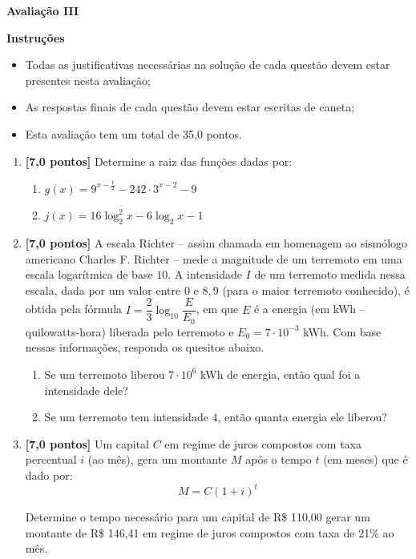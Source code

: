 \documentclass[12pt,a4paper]{article}
\begin{document}
\begin{center}
 \textbf{Avaliação III}
\end{center}

\textbf{Instruções}
\begin{itemize}
 \item Todas as justificativas necessárias na solução de cada questão devem estar presentes nesta avaliação;
 \item As respostas finais de cada questão devem estar escritas de caneta;
 \item Esta avaliação tem um total de 35,0 pontos.
\end{itemize}

\begin{enumerate}
  \item \textbf{[7,0 pontos]} Determine a raiz das funções dadas por:
    \begin{enumerate}
      \item $g(x) = 9^{x-\frac{1}{2}} - 242\cdot 3^{x-2} - 9$
      \item $j(x) = 16\log_2^2 x - 6\log_2 x - 1$
    \end{enumerate}
  
  \item \textbf{[7,0 pontos]} A escala Richter -- assim chamada em homenagem ao sismólogo americano
  Charles F. Richter -- mede a magnitude de um terremoto em uma escala logarítmica
  de base $10$. A intensidade $I$ de um terremoto medida nessa escala, dada por um
  valor entre $0$ e $8,9$ (para o maior terremoto conhecido), é obtida pela
  fórmula $I=\dfrac{2}{3}\log_{10}\dfrac{E}{E_{0}}$, em que $E$ é a energia
  (em kWh -- quilowatts-hora) liberada pelo terremoto e $E_{0}=7\cdot10^{-3}$ kWh.
  Com base nessas informações, responda os quesitos abaixo.
    \begin{enumerate}
      \item Se um terremoto liberou $7\cdot 10^6$ kWh de energia, então qual foi a intensidade dele?
      \item Se um terremoto tem intensidade $4$, então quanta energia ele liberou?
    \end{enumerate}
  
  \item \textbf{[7,0 pontos]} Um capital $C$ em regime de juros compostos com 
  taxa percentual $i$ (ao mês), gera um montante $M$ após o tempo $t$ (em meses) que é dado por:
  $$M = C(1 + i)^t$$

  Determine o tempo necessário para um capital de R\$ 110,00 gerar um montante
  de R\$ 146,41 em regime de juros compostos com taxa de 21\% ao mês.
  

\end{enumerate}
\end{document}
